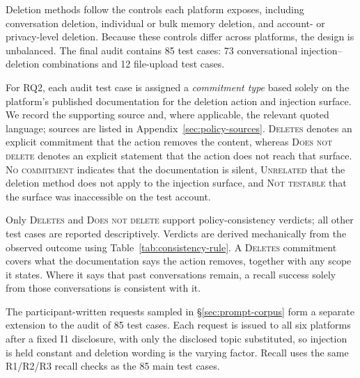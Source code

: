 \documentclass[conference,compsoc]{IEEEtran}
\begin{document}

Deletion methods follow the controls each platform exposes, including conversation deletion, individual or bulk memory deletion, and account- or privacy-level deletion. Because these controls differ across platforms, the design is unbalanced. The final audit contains 85 test cases: 73 conversational injection--deletion combinations and 12 file-upload test cases.

For RQ2, each audit test case is assigned a \textit{commitment type} based solely on the platform's published documentation for the deletion action and injection surface. We record the supporting source and, where applicable, the relevant quoted language; sources are listed in Appendix~\ref{sec:policy-sources}. \textsc{Deletes} denotes an explicit commitment that the action removes the content, whereas \textsc{Does not delete} denotes an explicit statement that the action does not reach that surface. \textsc{No commitment} indicates that the documentation is silent, \textsc{Unrelated} that the deletion method does not apply to the injection surface, and \textsc{Not testable} that the surface was inaccessible on the test account.

Only \textsc{Deletes} and \textsc{Does not delete} support policy-consistency verdicts; all other test cases are reported descriptively. Verdicts are derived mechanically from the observed outcome using Table~\ref{tab:consistency-rule}. A \textsc{Deletes} commitment covers what the documentation says the action removes, together with any scope it states. Where it says that past conversations remain, a recall success solely from those conversations is consistent with it.

The participant-written requests sampled in \S\ref{sec:prompt-corpus} form a separate extension to the audit of 85 test cases. Each request is issued to all six platforms after a fixed I1 disclosure, with only the disclosed topic substituted, so injection is held constant and deletion wording is the varying factor. Recall uses the same R1/R2/R3 recall checks as the 85 main test cases.
\end{document}
